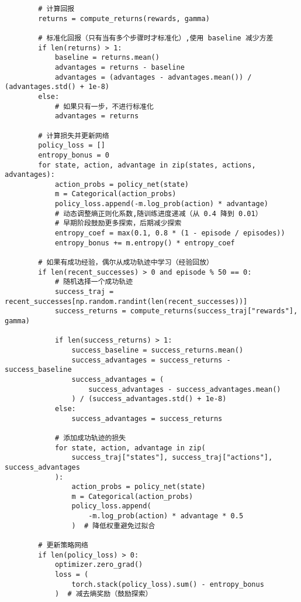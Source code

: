 \begin{verbatim}
        # 计算回报
        returns = compute_returns(rewards, gamma)

        # 标准化回报（只有当有多个步骤时才标准化）,使用 baseline 减少方差
        if len(returns) > 1:
            baseline = returns.mean()
            advantages = returns - baseline
            advantages = (advantages - advantages.mean()) / (advantages.std() + 1e-8)
        else:
            # 如果只有一步，不进行标准化
            advantages = returns

        # 计算损失并更新网络
        policy_loss = []
        entropy_bonus = 0
        for state, action, advantage in zip(states, actions, advantages):
            action_probs = policy_net(state)
            m = Categorical(action_probs)
            policy_loss.append(-m.log_prob(action) * advantage)
            # 动态调整熵正则化系数,随训练进度递减（从 0.4 降到 0.01）
            # 早期阶段鼓励更多探索，后期减少探索
            entropy_coef = max(0.1, 0.8 * (1 - episode / episodes))
            entropy_bonus += m.entropy() * entropy_coef

        # 如果有成功经验，偶尔从成功轨迹中学习（经验回放）
        if len(recent_successes) > 0 and episode % 50 == 0:
            # 随机选择一个成功轨迹
            success_traj = recent_successes[np.random.randint(len(recent_successes))]
            success_returns = compute_returns(success_traj["rewards"], gamma)

            if len(success_returns) > 1:
                success_baseline = success_returns.mean()
                success_advantages = success_returns - success_baseline
                success_advantages = (
                    success_advantages - success_advantages.mean()
                ) / (success_advantages.std() + 1e-8)
            else:
                success_advantages = success_returns

            # 添加成功轨迹的损失
            for state, action, advantage in zip(
                success_traj["states"], success_traj["actions"], success_advantages
            ):
                action_probs = policy_net(state)
                m = Categorical(action_probs)
                policy_loss.append(
                    -m.log_prob(action) * advantage * 0.5
                )  # 降低权重避免过拟合

        # 更新策略网络
        if len(policy_loss) > 0:
            optimizer.zero_grad()
            loss = (
                torch.stack(policy_loss).sum() - entropy_bonus
            )  # 减去熵奖励（鼓励探索）


\end{verbatim}
